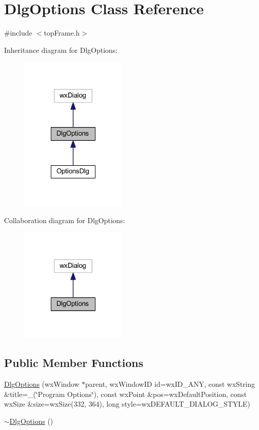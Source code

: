 \hypertarget{class_dlg_options}{\section{Dlg\-Options Class Reference}
\label{class_dlg_options}
}


{\ttfamily \#include $<$top\-Frame.\-h$>$}



Inheritance diagram for Dlg\-Options\-:\nopagebreak
\begin{figure}[H]
\begin{center}
\leavevmode
\includegraphics[width=144pt]{class_dlg_options__inherit__graph}
\end{center}
\end{figure}


Collaboration diagram for Dlg\-Options\-:\nopagebreak
\begin{figure}[H]
\begin{center}
\leavevmode
\includegraphics[width=144pt]{class_dlg_options__coll__graph}
\end{center}
\end{figure}
\subsection*{Public Member Functions}
\begin{DoxyCompactItemize}
\item 
\hyperlink{class_dlg_options_adc03c273f743697a2346cec1f3b34efa}{Dlg\-Options} (wx\-Window $\ast$parent, wx\-Window\-I\-D id=wx\-I\-D\-\_\-\-A\-N\-Y, const wx\-String \&title=\-\_\-(\char`\"{}Program Options\char`\"{}), const wx\-Point \&pos=wx\-Default\-Position, const wx\-Size \&size=wx\-Size(332, 364), long style=wx\-D\-E\-F\-A\-U\-L\-T\-\_\-\-D\-I\-A\-L\-O\-G\-\_\-\-S\-T\-Y\-L\-E)
\item 
\hyperlink{class_dlg_options_a7b031e3e51223bf34ca0881343c9de91}{$\sim$\-Dlg\-Options} ()
\end{DoxyCompactItemize}
